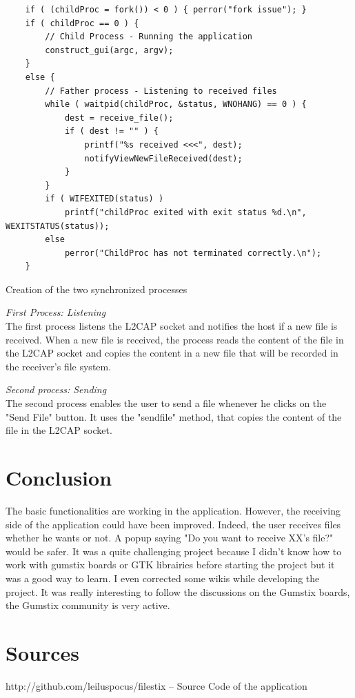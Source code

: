 \documentclass[a4paper, 12pt, final]{article}
\begin{document}
\begin{lstlisting}
	if ( (childProc = fork()) < 0 ) { perror("fork issue"); }	
	if ( childProc == 0 ) {
		// Child Process - Running the application  
		construct_gui(argc, argv); 
	}
	else {
		// Father process - Listening to received files
		while ( waitpid(childProc, &status, WNOHANG) == 0 ) {
			dest = receive_file();
			if ( dest != "" ) {
				printf("%s received <<<", dest);
				notifyViewNewFileReceived(dest);	
			}
		}
        if ( WIFEXITED(status) ) 
        	printf("childProc exited with exit status %d.\n", WEXITSTATUS(status));
        else 
        	perror("ChildProc has not terminated correctly.\n");
	}
\end{lstlisting}

\begin{center}
Creation of the two synchronized processes
\end{center}


\textit{First Process: Listening}\\
The first process listens the L2CAP socket and notifies the host if a new file is received. When a new file is received, the process reads the content of the file in the L2CAP socket and copies the content in a new file that will be recorded in the receiver's file system.

\textit{Second process: Sending}\\
The second process enables the user to send a file whenever he clicks on the "Send File" button. It uses the "sendfile" method, that copies the content of the file in the L2CAP socket. 



\section{Conclusion} 
The basic functionalities are working in the application. However, the receiving side of the application could have been improved. Indeed, the user receives files whether he wants or not. A popup saying "Do you want to receive XX's file?" would be safer.  
It was a quite challenging project because I didn't know how to work with gumstix boards or GTK librairies before starting the project but it was a good way to learn. I even corrected some wikis while developing the project. It was really interesting to follow the discussions on the Gumstix boards, the Gumstix community is very active.
 

\section{Sources}  
http://github.com/leiluspocus/filestix -- Source Code of the application
\end{document}
